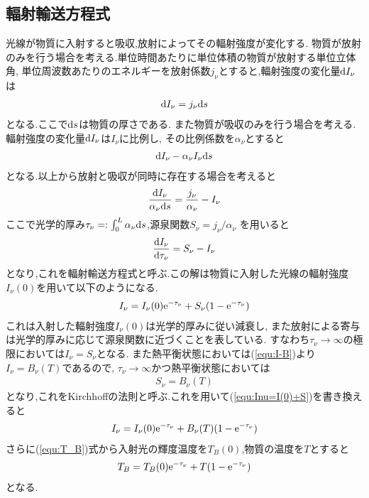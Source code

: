 \subsection{輻射輸送方程式}
\label{subsec:hukusyayuso}
光線が物質に入射すると吸収,放射によってその輻射強度が変化する.
物質が放射のみを行う場合を考える.単位時間あたりに単位体積の物質が放射する単位立体角,
単位周波数あたりのエネルギーを放射係数$j_{\nu}$とすると,輻射強度の変化量${\rm d}I_{\nu}$は
\begin{align}
  {\rm d}I_{\nu}=j_{\nu}{\rm d}s
\end{align}
となる.ここで${\rm d}s$は物質の厚さである.
また物質が吸収のみを行う場合を考える.輻射強度の変化量${\rm d}I_{\nu}$は$I_{\nu}$に比例し,
その比例係数を$\alpha_{\nu}$とすると
\begin{align}
  {\rm d}I_{\nu}-\alpha_{\nu}I_{\nu}{\rm d}s
\end{align}
となる.以上から放射と吸収が同時に存在する場合を考えると
\begin{align}
  \frac{{\rm d}I_{\nu}}{\alpha_{\nu}{\rm d}s}=\frac{j_{\nu}}{\alpha_{\nu}}-I_{\nu}
\end{align}
ここで光学的厚み$\tau_{\nu}=:\int_0^L\alpha_{\nu}{\rm d}s$,源泉関数$S_{\nu}=j_{\nu}/\alpha_{\nu}$
を用いると
\begin{align}
  \frac{{\rm d}I_{\nu}}{{\rm d}\tau_{\nu}}=S_{\nu}-I_{\nu}
\end{align}
となり,これを輻射輸送方程式と呼ぶ.この解は物質に入射した光線の輻射強度$I_{\nu}(0)$を用いて以下のようになる.
\begin{align}
  \label{equ:Inu=I(0)+S}
  I_{\nu}=I_{\nu}(0){\rm e}^{-\tau_{\nu}}+S_{\nu}(1-{\rm e}^{-\tau_{\nu}})
\end{align}
これは入射した輻射強度$I_{\nu}(0)$は光学的厚みに従い減衰し,
また放射による寄与は光学的厚みに応じて源泉関数に近づくことを表している.
すなわち$\tau_{\nu}\rightarrow\infty$の極限においては$I_{\nu}=S_{\nu}$となる.
また熱平衡状態においては(\ref{equ:I-B})より$I_\nu=B_\nu(T)$であるので,
$\tau_{\nu}\rightarrow\infty$かつ熱平衡状態においては
\begin{align}
  S_\nu=B_\nu(T)
\end{align}
となり,これをKirchhoffの法則と呼ぶ.これを用いて(\ref{equ:Inu=I(0)+S})を書き換えると
\begin{align}
  I_\nu=I_\nu(0){\rm e}^{-\tau_{\nu}}+B_\nu(T)(1-{\rm e}^{-\tau_{\nu}})
\end{align}
さらに(\ref{equ:T_B})式から入射光の輝度温度を$T_B(0)$,物質の温度を$T$とすると
\begin{align}
  \label{equ:TB=TB0+T}
  T_B=T_B(0){\rm e}^{-\tau_{\nu}}+T(1-{\rm e}^{-\tau_{\nu}})
\end{align}
となる.